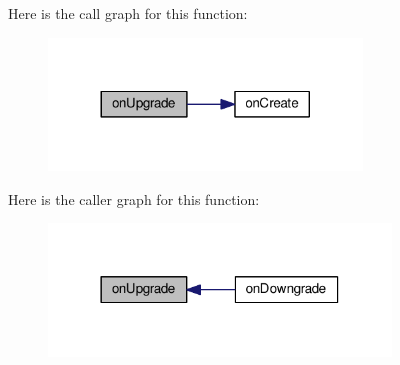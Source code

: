 Here is the call graph for this function\+:
\nopagebreak
\begin{figure}[H]
\begin{center}
\leavevmode
\includegraphics[width=236pt]{a00011_a47418a2bb9896d8cd648b4094755e6c7_cgraph}
\end{center}
\end{figure}




Here is the caller graph for this function\+:
\nopagebreak
\begin{figure}[H]
\begin{center}
\leavevmode
\includegraphics[width=258pt]{a00011_a47418a2bb9896d8cd648b4094755e6c7_icgraph}
\end{center}
\end{figure}




